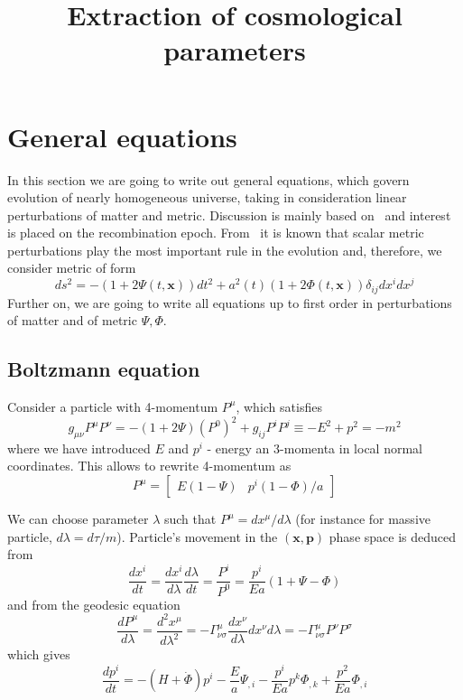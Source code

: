 \documentclass[12pt]{extarticle}
\title{Extraction of cosmological parameters}
\date{}
\numberwithin{problem}{section}
\numberwithin{theorem}{section}
\begin{document}
	\vspace{-3cm}
	\maketitle
	\section{General equations}
	In this section we are going to write out general equations, which govern evolution of nearly homogeneous universe, taking in consideration linear perturbations of matter and metric. Discussion is mainly based on~\cite{dodelson:2003} and interest is placed on the recombination epoch. From~\cite{gorbunov-rubakov:2011} it is known that scalar metric perturbations play the most important rule in the evolution and, therefore, we consider metric of form
	\begin{equation}
		ds^2 = -(1 + 2\Psi(t, \mathbf{x}))dt^2 + a^2(t)(1 + 2\Phi(t, \mathbf{x}))\delta_{ij}dx^idx^j	
	\end{equation}
	Further on, we are going to write all equations up to first order in perturbations of matter and of metric $\Psi, \Phi$.
	
	\subsection{Boltzmann equation}
	Consider a particle with 4-momentum $P^\mu$, which satisfies 
	\begin{equation}
		g_{\mu\nu} P^\mu P^\nu = -(1 + 2\Psi)(P^0)^2 + g_{ij}P^iP^j \equiv -E^2 + p^2 = -m^2
	\end{equation}
	where we have introduced $E$ and $p^i$ - energy an 3-momenta in local normal coordinates. This allows to rewrite 4-momentum as 
	\begin{equation}
		P^\mu = \begin{bmatrix}
			E(1 - \Psi) & p^i(1 - \Phi) / a
		\end{bmatrix}
	\end{equation}
	
	We can choose parameter $\lambda$ such that $P^\mu = dx^\mu/d\lambda$ (for instance for massive particle, $d\lambda = d\tau/m$). Particle's movement in the $(\mathbf{x},\mathbf{p})$ phase space is deduced from
	\begin{equation}
		\label{eq:boltzmann:position}
		\frac{dx^i}{dt} = \frac{dx^i}{d\lambda}\frac{d\lambda}{dt} = \frac{P^i}{P^0} = \frac{p^i}{Ea}(1+\Psi-\Phi)
	\end{equation}
	and from the geodesic equation
	\begin{equation}
		\label{eq:boltzmann:momentum}
		\frac{dP^\mu}{d\lambda} = \frac{d^2x^\mu}{d\lambda^2} = -\Gamma^\mu_{\nu\sigma}\frac{dx^\nu}{d\lambda}{dx^\nu}{d\lambda} = -\Gamma^\mu_{\nu\sigma}P^\nu P^\sigma
	\end{equation}
	which gives
	\begin{equation}
		\frac{dp^i}{dt} = -(H + \dot{\Phi})p^i - \frac{E}{a}\Psi_{,i} - \frac{p^i}{Ea}p^k\Phi_{,k} + \frac{p^2}{Ea}\Phi_{,i}
	\end{equation}
\end{document}

